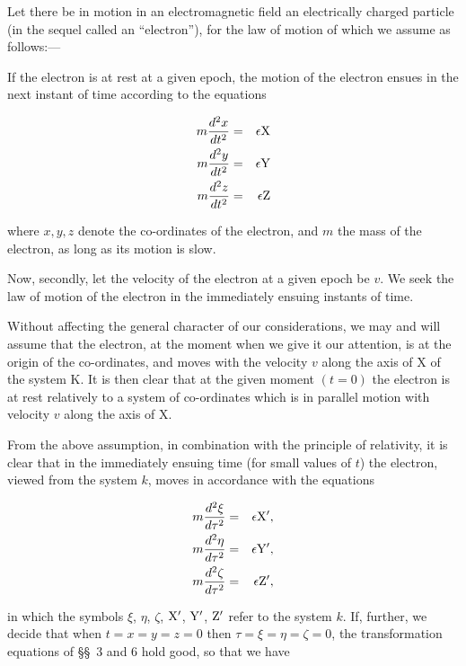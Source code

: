 \documentclass{article}
\newcommand{\pr}[1]{${\rm #1}'$}
\begin{document}
Let there be in motion in an electromagnetic field an electrically
charged particle (in the sequel called an ``electron''), for the law of
motion of which we assume as follows:---

If the electron is at rest at a given epoch, the motion of the
electron ensues in the next instant of time according to the equations

\begin{eqnarray*}
m\frac{d^2x}{dt^2} & = & \epsilon{\rm X} \\
m\frac{d^2y}{dt^2} & = & \epsilon{\rm Y} \\
m\frac{d^2z}{dt^2} & = & \epsilon{\rm Z} \\
\end{eqnarray*}

\noindent
where $x, y, z$ denote the co-ordinates of the electron, and $m$ the mass
of the electron, as long as its motion is slow.

Now, secondly, let the velocity of the electron at a given epoch be $v$.
We seek the law of motion of the electron in the immediately ensuing
instants of time.

Without affecting the general character of our considerations, we may
and will assume that the electron, at the moment when we give it our
attention, is at the origin of the co-ordinates, and moves with the
velocity $v$ along the axis of X of the system K\@.  It is then clear that
at the given moment $(t=0)$ the electron is at rest relatively to a
system of co-ordinates which is in parallel motion with velocity
$v$ along the axis of X.

From the above assumption, in combination with the principle of
relativity, it is clear that in the immediately ensuing time (for
small values of $t$) the electron, viewed from the system $k$, moves in
accordance with the equations

\begin{eqnarray*}
m\frac{d^2\xi}{d\tau^2} & = & \epsilon{\rm X'}, \\
m\frac{d^2\eta}{d\tau^2} & = & \epsilon{\rm Y'}, \\
m\frac{d^2\zeta}{d\tau^2} & = & \epsilon{\rm Z'}, \\
\end{eqnarray*}

\noindent
in which the symbols $\xi$, $\eta$, $\zeta$, \pr{X}, \pr{Y},
\pr{Z} refer to the system $k$.  If, further, we decide that
when $t=x=y=z=0$ then $\tau=\xi=\eta=\zeta=0$, the
transformation equations of \S\S\ 3 and 6 hold good, so that we
have
\end{document}
